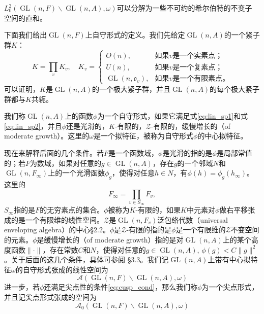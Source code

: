 \begin{theorem}
$L^2_0\left( \operatorname{GL}(n,F)\backslash \operatorname{GL}(n,A), \omega \right)$可以分解为一些不可约的希尔伯特的不变子
空间的直和。
\end{theorem}

下面我们给出$\operatorname{GL}(n,F)$上自守形式的定义。我们先给定$\operatorname{GL}(n, A)$的一个紧子群$K$：
$$
K = \prod\limits_v K_v, \quad K_v = \begin{cases} O(n), & \text{如果$v$是一个实素点；} \\ U(n), & \text{如果$v$是一个复素点；} \\ \operatorname{GL}(n,\mathfrak{o}_v), & \text{如果$v$是一个有限素点。} \end{cases}
$$
可以证明，$K$是$\operatorname{GL}(n, A)$的一个极大紧子群，并且$\operatorname{GL}(n, A)$的每个极大紧子群都与$K$共轭。

\begin{definition}
我们称$\operatorname{GL}(n, A)$上的函数$\phi$为一个自守形式，如果它满足式\eqref{eq:lin_sp1}和式\eqref{eq:lin_sp2}，并且$\phi$还是光滑的，$K$-有限的，$\mathcal{Z}$-有限的，缓慢增长的（of moderate growth）。这里的$\omega$是一个拟特征，被称为自守形式$\phi$的中心拟特征。
\end{definition}
现在来解释后面的几个条件。若$F$是一个函数域，$\phi$是光滑的指的是$\phi$是局部常值的；若$F$为数域，如果对任意的$g\in\operatorname{GL}(n,A)$，存在$g$的一个邻域$N$和$\operatorname{GL}(n,F_\infty)$上的一个光滑函数$\phi_g$，使得对任意$h \in N$，有$\phi(h) = \phi_g(h_\infty)$。这里的
$$F_\infty = \prod\limits_{v\in S_\infty} F_v,$$
$S_\infty$指的是$F$的无穷素点的集合。$\phi$被称为$K$-有限的，如果$K$中元素对$\phi$做右平移张
成的是一个有限维的线性空间。$\mathcal{Z}$是$\operatorname{GL}(n,F_v)$泛包络代数（universal enveloping algebra）的中心\S 2.2。$\phi$是$\mathcal{Z}$-有限的指的是$\phi$是一个有限维的$\mathcal{Z}$不变空间的元素。$\phi$是缓慢增长的（of moderate growth）指的是对$\operatorname{GL}(n,A)$上的某个高度函数$\lVert\cdot\rVert$，存在常数$C$和$N$，使得对任意的$g\in \operatorname{GL}(n,A)$, $\phi(g) < C\lVert g \rVert^2$。关于后面的这几个条件，具体可参阅 \S 3.3。我们记$\operatorname{GL}(n,A)$上带有中心拟特征$\omega$的自守形式张成的线性空间为
$$\mathcal{A}(\operatorname{GL}(n,F) \backslash \operatorname{GL}(n,A), \omega)$$
进一步，若$\phi$还满足尖点性的条件\eqref{eq:cusp_cond}，那么我们称$\phi$为一个尖点形式，并且记尖点形式张成的空间为
$$\mathcal{A}_0(\operatorname{GL}(n,F) \backslash \operatorname{GL}(n,A), \omega)$$

